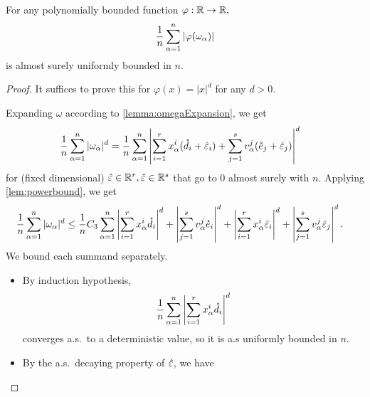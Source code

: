 \documentclass[main.tex]{subfiles}
\begin{document}
\begin{lemma}\label{lemma:omegaAlphaUnifomBounded}
  For any polynomially bounded function $\varphi: \mathbb{R} \to \mathbb{R},$
  \[
  \frac{1}{n} \sum_{\alpha=1}^n |\varphi(\omega_\alpha)|
  \]
  is almost surely uniformly bounded in $n$.
\end{lemma}
\begin{proof}
  It suffices to prove this for $\varphi(x) = |x|^d$ for any $d > 0$.
  
  Expanding $\omega$ according to \cref{lemma:omegaExpansion}, we get
  \begin{align*}
      \frac{1}{n} \sum_{\alpha=1}^n |\omega_\alpha|^{d}
      &=
          \frac{1}{n} \sum_{\alpha=1}^n \left|
              \sum_{i=1}^r
                  x_\alpha^i (\mathring {d}_i + \hat\varepsilon_i)
              + \sum_{j=1}^s
                  v_\alpha^j (\mathring{e}_j + \check\varepsilon_j)
          \right|^d
  \end{align*}
  for (fixed dimensional) $\hat\varepsilon \in \mathbb{R}^r, \check\varepsilon \in \mathbb{R}^s$ that go to 0 almost surely with $n$.
  Applying \cref{lem:powerbound}, we get
  \begin{align*}
      \frac{1}{n} \sum_{\alpha=1}^n |\omega_\alpha|^d
      &\le
          \frac{1}{n} C_3\sum_{\alpha=1}^n
              \left|
                  \sum_{i=1}^r
                  x_\alpha^i \mathring {d}_i
              \right|^d
              +
              \left|
                  \sum_{j=1}^s
                  v_\alpha^j \mathring {e}_i
              \right|^d
              +
              \left|
                  \sum_{i=1}^r
                  x_\alpha^i \hat\varepsilon_i
              \right|^d
              +
              \left|
                  \sum_{j=1}^s
                  v_\alpha^j \check\varepsilon_j
              \right|^d
              .
  \end{align*}
  We bound each summand separately.
  \begin{itemize}
      \item
          By induction hypothesis, 
          \begin{align*}
              \frac{1}{n} \sum_{\alpha=1}^n
              \left|
                  \sum_{i=1}^r
                  x_\alpha^i \mathring {d}_i
              \right|^d
          \end{align*}
          converges a.s.\ to a deterministic value, so it is a.s uniformly bounded in $n.$
      \item
          By the a.s.\ decaying property of $\hat\varepsilon$, we have

\end{itemize}
\end{proof}
\end{document}
